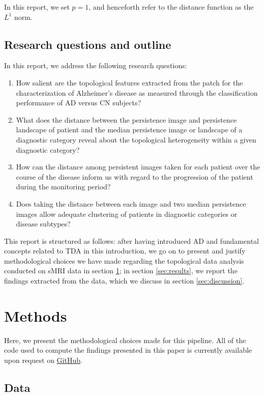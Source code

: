 \documentclass{article}
\begin{document}
In this report, we set $p=1$, and henceforth refer to the distance function as the $L^1$ norm.

\subsection{Research questions and outline}

In this report, we address the following research questions:

\begin{enumerate}
\item How salient are the topological features extracted from the patch for the characterization of Alzheimer's disease as measured through the classification performance of AD versus CN subjects?
\item What does the distance between the persistence image and persistence landscape of patient and the median persistence image or landscape of a diagnostic category reveal about the topological heterogeneity within a given diagnostic category?
\item How can the distance among persistent images taken for each patient over the course of the disease inform us with regard to the progression of the patient during the monitoring period?
\item Does taking the distance between each image and two median persistence images allow adequate clustering of patients in diagnostic categories or disease subtypes?
\end{enumerate}

This report is structured as follows: after having introduced AD and fundamental concepts related to TDA in this introduction, we go on to present and justify methodological choices we have made regarding the topological data analysis conducted on sMRI data in section \ref{sec:methods}; in section \ref{sec:results}, we report the findings extracted from the data, which we discuss in section \ref{sec:discussion}.

\section{Methods}\label{sec:methods}

Here, we present the methodological choices made for this pipeline. All of the code used to compute the findings presented in this paper is currently available upon request on \href{https://github.com/pjhartout/TDA_ADNI_MLCB}{GitHub}.

\subsection{Data}
\end{document}
